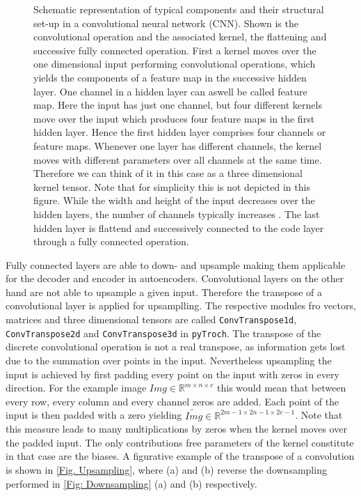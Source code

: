 \begin{figure}
	\centering
	
	\caption{\footnotesize Schematic representation of typical components and their structural set-up in a convolutional neural network (CNN). Shown is the convolutional operation and the associated kernel, the flattening and successive fully connected operation. First a kernel moves over the one dimensional input performing convolutional operations, which yields the components of a feature map in the successive hidden layer. One channel in a hidden layer can aswell be called feature map. Here the input has just one channel, but four different kernels move over the input which produces four feature maps in the first hidden layer. Hence the first hidden layer comprises four channels or feature maps. Whenever one layer has different channels, the kernel moves with different parameters over all channels at the same time. Therefore we can think of it in this case as a three dimensional kernel tensor. Note that for simplicity this is not depicted in this figure. While the width and height of the input decreases over the hidden layers, the number of channels typically increases . The last hidden layer is flattend and successively connected to the code layer through a fully connected operation.}
	\label{Fig: Kernel}
\end{figure}\noindent
Fully connected layers are able to down- and upsample making them applicable for the decoder and encoder in autoencoders. Convolutional layers on the other hand are not able to upsample a given input. Therefore the transpose of a convolutional layer is applied for upsamplling. The respective modules fro vectors, matrices and three dimensional tensors are called \texttt{ConvTranspose1d}, \texttt{ConvTranspose2d} and \texttt{ConvTranspose3d} in \texttt{pyTroch}. The transpose of the discrete convolutional operation is not a real transpose, as information gets lost due to the summation over points in the input. Nevertheless upsampling the input is achieved by first padding every point on the input with zeros in every direction. For the example image $Img \in \mathbb{R}^{m\times n\times c}$ this would mean that between every row, every column and every channel zeros are added. Each point of the input is then padded with a zero yielding $\tilde{Img} \in \mathbb{R}^{2m-1\times 2n-1\times 2c-1}$. Note that this measure leads to many multiplications by zeros when the kernel moves over the padded input. The only contributions free parameters of the kernel constitute  in that case are the biases. A figurative example of the transpose of a convolution is shown in \cref{Fig. Upsampling}, where (a) and (b) reverse the downsampling performed in \cref{Fig: Downsampling} (a) and (b) respectively.   

